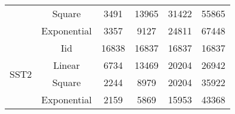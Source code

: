 \begin{table}[t]
{\begin{tabular}{|c|c|c|c|c|c|}
                      & Square      & 3491  & 13965 & 31422  & 55865  \\
                      & Exponential & 3357  & 9127  & 24811  & 67448  \\ \hline
                      & Iid         & 16838 & 16837 & 16837  & 16837  \\
\multirow{2}{*}{SST2} & Linear      & 6734  & 13469 & 20204  & 26942  \\
                      & Square      & 2244  & 8979  & 20204  & 35922  \\
                      & Exponential & 2159  & 5869  & 15953  & 43368  \\ \hline
\end{tabular}%
}
\end{table}

\begin{table*}[t]
\caption{Required Noise per Data Partition to Achieve \(\epsilon\) = 6 and \(\epsilon\) = 10 for accountants \rdp~and \sys }
\end{table*}
